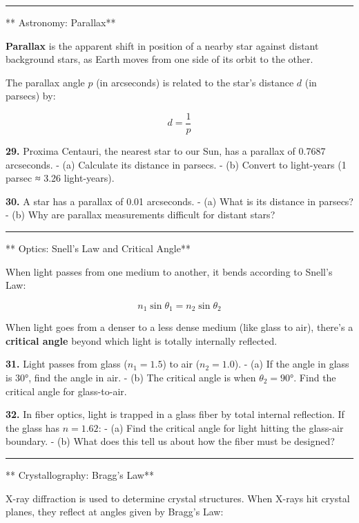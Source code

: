 \documentclass[
  11pt,
]{article}
\begin{document}
\begin{center}\rule{0.5\linewidth}{0.5pt}\end{center}

** Astronomy: Parallax**

\textbf{Parallax} is the apparent shift in position of a nearby star
against distant background stars, as Earth moves from one side of its
orbit to the other.

The parallax angle \(p\) (in arcseconds) is related to the star's
distance \(d\) (in parsecs) by:

\[d = \frac{1}{p}\]

\textbf{29.} Proxima Centauri, the nearest star to our Sun, has a
parallax of 0.7687 arcseconds. - (a) Calculate its distance in parsecs.
- (b) Convert to light-years (1 parsec ≈ 3.26 light-years).

\textbf{30.} A star has a parallax of 0.01 arcseconds. - (a) What is its
distance in parsecs? - (b) Why are parallax measurements difficult for
distant stars?

\begin{center}\rule{0.5\linewidth}{0.5pt}\end{center}

** Optics: Snell's Law and Critical Angle**

When light passes from one medium to another, it bends according to
Snell's Law:

\[n_1 \sin\theta_1 = n_2 \sin\theta_2\]

When light goes from a denser to a less dense medium (like glass to
air), there's a \textbf{critical angle} beyond which light is totally
internally reflected.

\textbf{31.} Light passes from glass (\(n_1 = 1.5\)) to air
(\(n_2 = 1.0\)). - (a) If the angle in glass is 30°, find the angle in
air. - (b) The critical angle is when \(\theta_2 = 90°\). Find the
critical angle for glass-to-air.

\textbf{32.} In fiber optics, light is trapped in a glass fiber by total
internal reflection. If the glass has \(n = 1.62\): - (a) Find the
critical angle for light hitting the glass-air boundary. - (b) What does
this tell us about how the fiber must be designed?

\begin{center}\rule{0.5\linewidth}{0.5pt}\end{center}

** Crystallography: Bragg's Law**

X-ray diffraction is used to determine crystal structures. When X-rays
hit crystal planes, they reflect at angles given by Bragg's Law:
\end{document}
